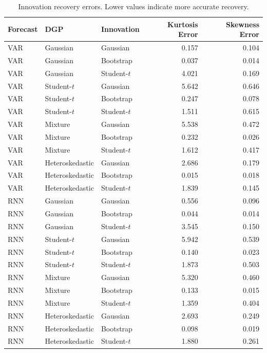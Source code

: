 \documentclass[11pt]{article}
\begin{document}
\begin{table}[H]
\centering
\caption{Innovation recovery errors. Lower values indicate more accurate recovery.}
\label{tab:innovation_recovery_summary}
\small
\begin{tabular}{lllrr}
\toprule
Forecast & DGP & Innovation & Kurtosis Error & Skewness Error \\
\midrule
VAR & Gaussian & Gaussian & 0.157 & 0.104 \\
VAR & Gaussian & Bootstrap & 0.037 & 0.014 \\
VAR & Gaussian & Student-\(t\) & 4.021 & 0.169 \\
\midrule
VAR & Student-\(t\) & Gaussian & 5.642 & 0.646 \\
VAR & Student-\(t\) & Bootstrap & 0.247 & 0.078 \\
VAR & Student-\(t\) & Student-\(t\) & 1.511 & 0.615 \\
\midrule
VAR & Mixture & Gaussian & 5.538 & 0.472 \\
VAR & Mixture & Bootstrap & 0.232 & 0.026 \\
VAR & Mixture & Student-\(t\) & 1.612 & 0.417 \\
\midrule
VAR & Heteroskedastic & Gaussian & 2.686 & 0.179 \\
VAR & Heteroskedastic & Bootstrap & 0.015 & 0.018 \\
VAR & Heteroskedastic & Student-\(t\) & 1.839 & 0.145 \\
\midrule
RNN & Gaussian & Gaussian & 0.556 & 0.096 \\
RNN & Gaussian & Bootstrap & 0.044 & 0.014 \\
RNN & Gaussian & Student-\(t\) & 3.545 & 0.150 \\
\midrule
RNN & Student-\(t\) & Gaussian & 5.942 & 0.539 \\
RNN & Student-\(t\) & Bootstrap & 0.140 & 0.023 \\
RNN & Student-\(t\) & Student-\(t\) & 1.873 & 0.503 \\
\midrule
RNN & Mixture & Gaussian & 5.320 & 0.460 \\
RNN & Mixture & Bootstrap & 0.133 & 0.015 \\
RNN & Mixture & Student-\(t\) & 1.359 & 0.404 \\
\midrule
RNN & Heteroskedastic & Gaussian & 2.693 & 0.249 \\
RNN & Heteroskedastic & Bootstrap & 0.098 & 0.019 \\
RNN & Heteroskedastic & Student-\(t\) & 1.880 & 0.261 \\
\bottomrule
\end{tabular}
\end{table}
\end{document}

